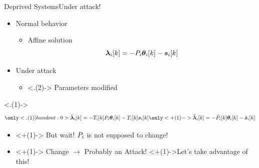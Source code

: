 \documentclass[aspectratio=169]{beamer}
\begin{document}
\begin{frame}{Deprived Systems}{Under attack!}
  \begin{minipage}[t]{.45\linewidth}
    \begin{itemize}[<+->]
      \item Normal behavior
            \begin{itemize}
              \item Affine solution
                    \begin{equation*}
                      \lambdaik=-\Plin\thetaik-\sik
                    \end{equation*}
            \end{itemize}
    \end{itemize}
  \end{minipage}
  \hfill
  \begin{minipage}[t]{.45\linewidth}
    \begin{itemize}
      \item<+-> Under attack \onslide<+->{$\to$ $\lambdaicheat=\Tik\lambdai$}
            \begin{itemize}
              \item<.(2)-> Parameters modified
            \end{itemize}
    \end{itemize}
    \only<.(1)->{
      \begin{equation*}
        \only<.(1)|handout:0>{\lambdaicheat[k]=-\Tik\Plin\thetaik-\Tik\sik}
        \only<+(1)->{\lambdaicheat[k]=-\Plintilde\thetaik-\siktilde}
      \end{equation*}
    }
  \end{minipage}
  \centering
  \begin{itemize}
    \item<+(1)-> But wait! ${P}_{i}$ is not supposed to change!
    \item<+(1)-> Change $\to$ Probably an Attack! \onslide<+(1)->{Let's take advantage of this!}
  \end{itemize}
\end{frame}
\end{document}
